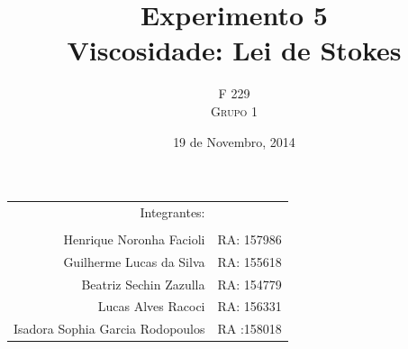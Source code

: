 \documentclass[english,brazil]{article}
\title{Experimento 5  \\ Viscosidade: Lei de Stokes } %
\author{F 229 \\ \textsc{Grupo 1}}
\date{19 de Novembro, 2014}
\providecommand{\tabularnewline}{\\}
\begin{document}
	 \maketitle



	\begin{center}
		\begin{tabular}{rr}
			                    Integrantes:  & \tabularnewline
			                                  & \tabularnewline
			        Henrique Noronha Facioli  & RA: 157986 \tabularnewline
			        Guilherme Lucas da Silva  & RA: 155618 \tabularnewline
			          Beatriz Sechin Zazulla  & RA: 154779 \tabularnewline
			              Lucas Alves Racoci  & RA: 156331 \tabularnewline
			Isadora Sophia Garcia Rodopoulos  & RA :158018 \tabularnewline
		\end{tabular}
	\par\end{center}

\end{document}

